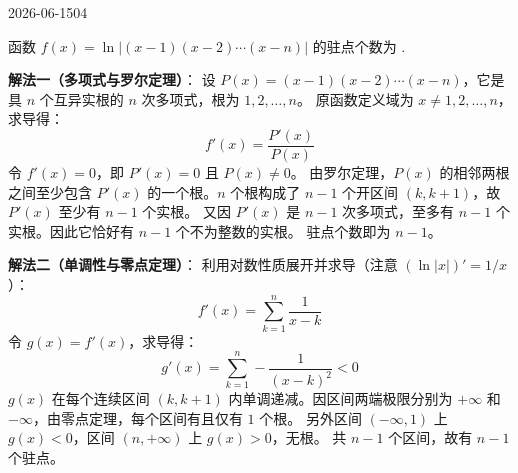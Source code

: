 \begin{mistake}{2026-06-15}{04}

\begin{problemcontent}
函数 \( f(x) = \ln |(x-1)(x-2)\cdots(x-n)| \) 的驻点个数为 \underline{\hspace{1cm}}.
\end{problemcontent}

\begin{solutioncontent}
\textbf{解法一（多项式与罗尔定理）}：
设 \( P(x) = (x-1)(x-2)\cdots(x-n) \)，它是具 \( n \) 个互异实根的 \( n \) 次多项式，根为 \( 1, 2, \dots, n \)。
原函数定义域为 \( x \neq 1, 2, \dots, n \)，求导得：
\[ f'(x) = \frac{P'(x)}{P(x)} \]
令 \( f'(x) = 0 \)，即 \( P'(x) = 0 \) 且 \( P(x) \neq 0 \)。
由罗尔定理，\( P(x) \) 的相邻两根之间至少包含 \( P'(x) \) 的一个根。\( n \) 个根构成了 \( n-1 \) 个开区间 \( (k, k+1) \)，故 \( P'(x) \) 至少有 \( n-1 \) 个实根。
又因 \( P'(x) \) 是 \( n-1 \) 次多项式，至多有 \( n-1 \) 个实根。因此它恰好有 \( n-1 \) 个不为整数的实根。
驻点个数即为 \( n-1 \)。

\textbf{解法二（单调性与零点定理）}：
利用对数性质展开并求导（注意 \( (\ln|x|)' = 1/x \)）：
\[ f'(x) = \sum_{k=1}^n \frac{1}{x-k} \]
令 \( g(x) = f'(x) \)，求导得：
\[ g'(x) = \sum_{k=1}^n -\frac{1}{(x-k)^2} < 0 \]
\( g(x) \) 在每个连续区间 \( (k, k+1) \) 内单调递减。因区间两端极限分别为 \( +\infty \) 和 \( -\infty \)，由零点定理，每个区间有且仅有 \( 1 \) 个根。
另外区间 \( (-\infty, 1) \) 上 \( g(x) < 0 \)，区间 \( (n, +\infty) \) 上 \( g(x) > 0 \)，无根。
共 \( n-1 \) 个区间，故有 \( n-1 \) 个驻点。
\end{solutioncontent}


\end{mistake}
